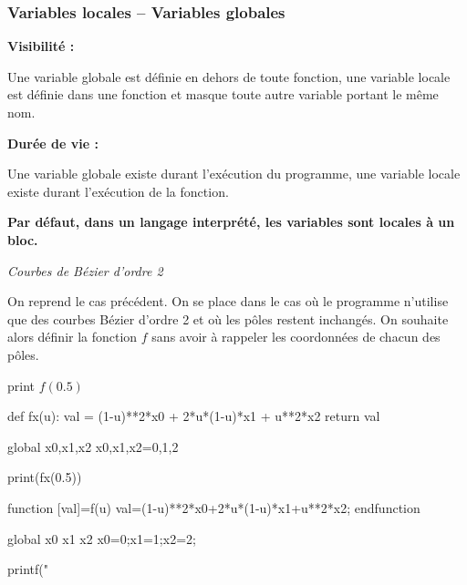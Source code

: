\documentclass[11pt,oneside]{article}
\begin{document}
\subsubsection{Variables locales -- Variables globales}

\begin{defi}
\textbf{Visibilité :}

Une variable globale est définie en dehors de toute fonction, une variable locale est définie dans une fonction et masque toute autre variable portant le même nom.

\textbf{Durée de vie :}

Une variable globale existe durant l'exécution du programme, une variable locale existe durant l'exécution de la fonction.

\textbf{Par défaut, dans un langage interprété, les variables sont locales à un bloc.}
\end{defi}



\begin{exemple}
\textit{Courbes de Bézier d'ordre 2}

On reprend le cas précédent. On se place dans le cas où le programme n'utilise que des courbes Bézier d'ordre 2 et où les pôles restent inchangés. On souhaite alors définir la fonction $f$ sans avoir à rappeler les coordonnées de chacun des pôles.

 

\begin{pseudo}
\begin{algorithm}[H]
print $f(0.5)$
\end{algorithm}
\end{pseudo}
\begin{py}
\begin{python}
def fx(u):
    val = (1-u)**2*x0 + 2*u*(1-u)*x1 + u**2*x2
    return val
    
global x0,x1,x2
x0,x1,x2=0,1,2

print(fx(0.5))  
\end{python}
\end{py}

\begin{sci}
\begin{scilab}
function [val]=f(u)
  val=(1-u)**2*x0+2*u*(1-u)*x1+u**2*x2;
endfunction

global x0 x1 x2
x0=0;x1=1;x2=2;

printf("%
\end{scilab}
\end{sci}

\end{exemple}
\end{document}
